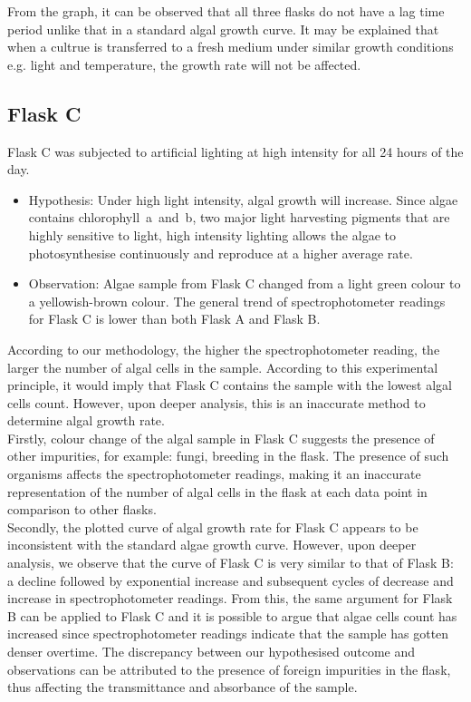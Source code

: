\documentclass[12pt,a4paper]{IEEEtran}
\begin{document}
    From the graph, it can be observed that all three flasks do not have a lag time period unlike that in a standard algal growth curve. It may be explained that when a cultrue is transferred to a fresh medium under similar growth conditions e.g. light and temperature, the growth rate will not be affected. 
    
    \subsection{Flask C}
    Flask C was subjected to artificial lighting at high intensity for all 24 hours of the day. \\
    
    \begin{itemize}
    	\item Hypothesis: Under high light intensity, algal growth will increase. Since algae contains chlorophyll~a~and~b, two major light harvesting pigments that are highly sensitive to light, high intensity lighting allows the algae to photosynthesise continuously and reproduce at a higher average rate. \\
    	\item Observation: Algae sample from Flask C changed from a light green colour to a yellowish-brown colour. The general trend of spectrophotometer readings for Flask C is lower than both Flask A and Flask B. \\
    \end{itemize}
    According to our methodology, the higher the spectrophotometer reading, the larger the number of algal cells in the sample. According to this experimental principle, it would imply that Flask C contains the sample with the lowest algal cells count. However, upon deeper analysis, this is an inaccurate method to determine algal growth rate. \\
    
    Firstly, colour change of the algal sample in Flask C suggests the presence of other impurities, for example: fungi, breeding in the flask. The presence of such organisms affects the spectrophotometer readings, making it an inaccurate representation of the number of algal cells in the flask at each data point in comparison to other flasks. \\
    
    Secondly, the plotted curve of algal growth rate for Flask C appears to be inconsistent with the standard algae growth curve. However, upon deeper analysis, we observe that the curve of Flask C is very similar to that of Flask B: a decline followed by exponential increase and subsequent cycles of decrease and increase in spectrophotometer readings. From this, the same argument for Flask B can be applied to Flask C and it is possible to argue that algae cells count has increased since spectrophotometer readings indicate that the sample has gotten denser overtime. The discrepancy between our hypothesised outcome and observations can be attributed to the presence of foreign impurities in the flask, thus affecting the transmittance and absorbance of the sample. \\ \vspace{-0.1in}
    
\end{document}
